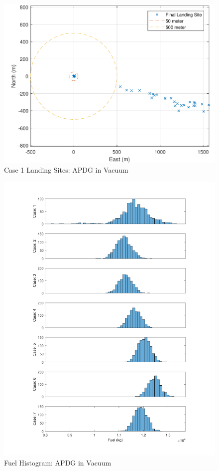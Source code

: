 \begin{figure}[H]
	\centering
	\begin{minipage}{4.3 in}
		\includegraphics[width=\linewidth]{Figures/bulldisppowvac.pdf}
		\caption{Case 1 Landing Sites: APDG in Vacuum \label{fig:bulldisppowvac} }
	\end{minipage}
\end{figure}

\begin{figure}[H]
	\centering
	\begin{minipage}{4.3 in}
		\includegraphics[width=\linewidth]{Figures/hfueldisppowvac.pdf}
		\caption{Fuel Histogram: APDG in Vacuum \label{fig:hfueldisppowvac} }
	\end{minipage}
\end{figure}

